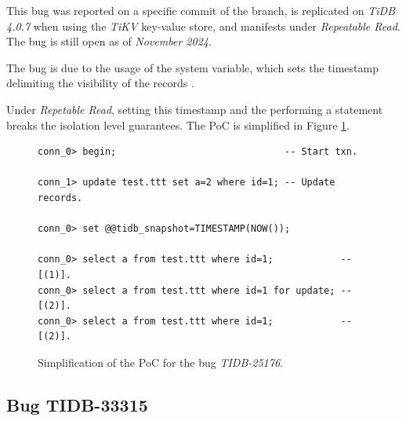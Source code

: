 This bug was reported on a specific commit of the  branch, is replicated on \textit{TiDB 4.0.7} when using the \textit{TiKV} key-value store, and manifests under \textit{Repeatable Read}. The bug is still open as of \textit{November 2024}.

The bug is due to the usage of the  system variable, which sets the timestamp delimiting the visibility of the records \cite{tidbsnapshot}. 

Under \textit{Repetable Read}, setting this timestamp and the performing a  statement breaks the isolation level guarantees. The PoC is simplified in Figure \ref{fig:TIDB-25176}.

\begin{figure}[H]
\begin{verbatim}
conn_0> begin;                              -- Start txn.
    
conn_1> update test.ttt set a=2 where id=1; -- Update records.

conn_0> set @@tidb_snapshot=TIMESTAMP(NOW());

conn_0> select a from test.ttt where id=1;            -- [(1)].
conn_0> select a from test.ttt where id=1 for update; -- [(2)].
conn_0> select a from test.ttt where id=1;            -- [(2)].
\end{verbatim}
\caption{Simplification of the PoC for the bug \textit{TIDB-25176}.} \label{fig:TIDB-25176}
\end{figure}

\subsection*{Bug TIDB-33315}
